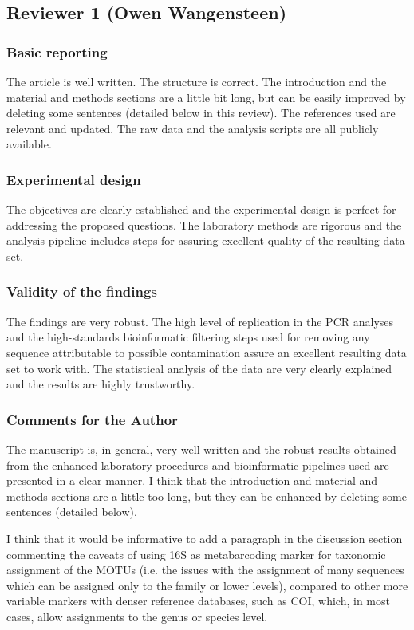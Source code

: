 \documentclass{article}
\begin{document}
\subsection*{Reviewer 1 (Owen Wangensteen)}

\subsubsection*{Basic reporting}
The article is well written. The structure is correct. The introduction and the material and methods sections are a little bit long, but can be easily improved by deleting some sentences (detailed below in this review). The references used are relevant and updated. The raw data and the analysis scripts are all publicly available.

\subsubsection*{Experimental design}
The objectives are clearly established and the experimental design is perfect for addressing the proposed questions. The laboratory methods are rigorous and the analysis pipeline includes steps for assuring excellent quality of the resulting data set.

\subsubsection*{Validity of the findings}
The findings are very robust. The high level of replication in the PCR analyses and the high-standards bioinformatic filtering steps used for removing any sequence attributable to possible contamination assure an excellent resulting data set to work with. The statistical analysis of the data are very clearly explained and the results are highly trustworthy.

\subsubsection*{Comments for the Author}
The manuscript is, in general, very well written and the robust results obtained from the enhanced laboratory procedures and bioinformatic pipelines used are presented in a clear manner. I think that the introduction and material and methods sections are a little too long, but they can be enhanced by deleting some sentences (detailed below).

I think that it would be informative to add a paragraph in the discussion section commenting the caveats of using 16S as metabarcoding marker for taxonomic assignment of the MOTUs (i.e. the issues with the assignment of many sequences which can be assigned only to the family or lower levels), compared to other more variable markers with denser reference databases, such as COI, which, in most cases, allow assignments to the genus or species level.
\end{document}
